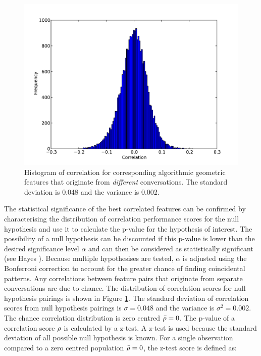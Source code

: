 \begin{figure}[tb]
\centering
\includegraphics[width = 0.8 \columnwidth]{backchannel/correlationHist.pdf}

\caption[Histogram of correlation for corresponding algorithmic geometric features that originate from \textit{different} conversations.]{Histogram of correlation for corresponding algorithmic geometric features that originate from \textit{different} conversations. The standard deviation is 0.048 and the variance is 0.002.}
\label{FigureCorrelationHist}
\end{figure}

The statistical significance of the best correlated features can be confirmed by characterising the distribution of correlation performance scores for the null hypothesis and use it to calculate the p-value for the hypothesis of interest. The possibility of a null hypothesis can be discounted if this p-value is lower than the desired significance level $\alpha$ and can then be considered as statistically significant (see Hayes \cite{Hayes2005}). Because multiple hypothesises are tested, $\alpha$ is adjusted using the Bonferroni correction to account for the greater chance of finding coincidental patterns. Any correlations between feature pairs that originate from separate conversations are due to chance. The distribution of correlation scores for null hypothesis pairings is shown in Figure \ref{FigureCorrelationHist}. The standard deviation of correlation scores from null hypothesis pairings is $\sigma=0.048$ and the variance is $\sigma^2=0.002$. The chance correlation distribution is zero centred $\bar{\rho}=0$. The p-value of a correlation score $\rho$ is calculated by a z-test. A z-test is used because the standard deviation of all possible null hypothesis is known. For a single observation compared to a zero centred population $\bar{\rho}=0$, the z-test score is defined as:

